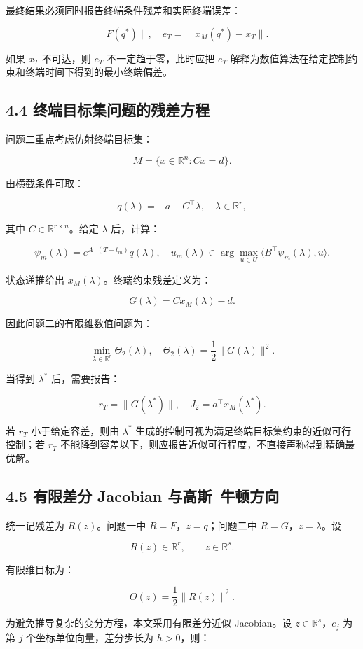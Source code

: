 \documentclass[UTF8,a4paper,zihao=-4]{ctexart}
\begin{document}
最终结果必须同时报告终端条件残差和实际终端误差：

\[
\|F(q^*)\|,\quad e_T=\|x_M(q^*)-x_T\|.
\]

如果 $x_T$ 不可达，则 $e_T$ 不一定趋于零，此时应把 $e_T$ 解释为数值算法在给定控制约束和终端时间下得到的最小终端偏差。

\subsection{4.4 终端目标集问题的残差方程}

问题二重点考虑仿射终端目标集：

\[
M=\{x\in\mathbb{R}^n:Cx=d\}.
\]

由横截条件可取：

\[
q(\lambda)=-a-C^\top\lambda,\quad \lambda\in\mathbb{R}^r,
\]

其中 $C\in\mathbb{R}^{r\times n}$。给定 $\lambda$ 后，计算：

\[
\psi_m(\lambda)=e^{A^\top(T-t_m)}q(\lambda),\quad
u_m(\lambda)\in\arg\max_{u\in U}\langle B^\top\psi_m(\lambda),u\rangle.
\]

状态递推给出 $x_M(\lambda)$。终端约束残差定义为：

\[
G(\lambda)=Cx_M(\lambda)-d.
\]

因此问题二的有限维数值问题为：

\[
\min_{\lambda\in\mathbb{R}^r}\Theta_2(\lambda),\quad
\Theta_2(\lambda)=\frac{1}{2}\|G(\lambda)\|^2.
\]

当得到 $\lambda^*$ 后，需要报告：

\[
r_T=\|G(\lambda^*)\|,\quad J_2=a^\top x_M(\lambda^*).
\]

若 $r_T$ 小于给定容差，则由 $\lambda^*$ 生成的控制可视为满足终端目标集约束的近似可行控制；若 $r_T$ 不能降到容差以下，则应报告近似可行程度，不直接声称得到精确最优解。

\subsection{4.5 有限差分 Jacobian 与高斯--牛顿方向}

统一记残差为 $R(z)$。问题一中 $R=F$，$z=q$；问题二中 $R=G$，$z=\lambda$。设

\[
R(z)\in\mathbb{R}^r,\qquad z\in\mathbb{R}^s.
\]

有限维目标为：

\[
\Theta(z)=\frac{1}{2}\|R(z)\|^2.
\]

为避免推导复杂的变分方程，本文采用有限差分近似 Jacobian。设 $z\in\mathbb{R}^s$，$e_j$ 为第 $j$ 个坐标单位向量，差分步长为 $h>0$，则：
\end{document}
